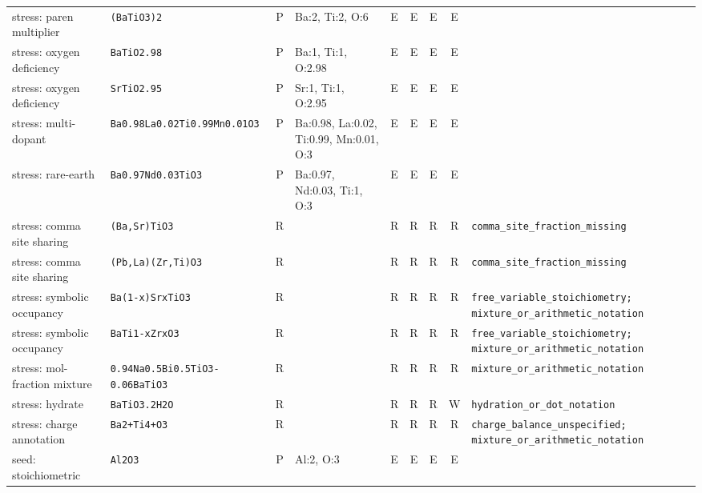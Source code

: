 \begin{longtable}{@{}>{\raggedright\arraybackslash}p{2.5cm}lcp{2.9cm}cccc>{\raggedright\arraybackslash}p{2.7cm}@{}}
stress: paren multiplier & \texttt{(BaTiO3)2} & P & Ba:2, Ti:2, O:6 & E & E & E & E & {\scriptsize\texttt{}} \\
stress: oxygen deficiency & \texttt{BaTiO2.98} & P & Ba:1, Ti:1, O:2.98 & E & E & E & E & {\scriptsize\texttt{}} \\
stress: oxygen deficiency & \texttt{SrTiO2.95} & P & Sr:1, Ti:1, O:2.95 & E & E & E & E & {\scriptsize\texttt{}} \\
stress: multi-dopant & \texttt{Ba0.98La0.02Ti0.99Mn0.01O3} & P & Ba:0.98, La:0.02, Ti:0.99, Mn:0.01, O:3 & E & E & E & E & {\scriptsize\texttt{}} \\
stress: rare-earth & \texttt{Ba0.97Nd0.03TiO3} & P & Ba:0.97, Nd:0.03, Ti:1, O:3 & E & E & E & E & {\scriptsize\texttt{}} \\
stress: comma site sharing & \texttt{(Ba,Sr)TiO3} & R &  & R & R & R & R & {\scriptsize\texttt{comma\_\allowbreak{}site\_\allowbreak{}fraction\_\allowbreak{}missing}} \\
stress: comma site sharing & \texttt{(Pb,La)(Zr,Ti)O3} & R &  & R & R & R & R & {\scriptsize\texttt{comma\_\allowbreak{}site\_\allowbreak{}fraction\_\allowbreak{}missing}} \\
stress: symbolic occupancy & \texttt{Ba(1-x)SrxTiO3} & R &  & R & R & R & R & {\scriptsize\texttt{free\_\allowbreak{}variable\_\allowbreak{}stoichiometry; mixture\_\allowbreak{}or\_\allowbreak{}arithmetic\_\allowbreak{}notation}} \\
stress: symbolic occupancy & \texttt{BaTi1-xZrxO3} & R &  & R & R & R & R & {\scriptsize\texttt{free\_\allowbreak{}variable\_\allowbreak{}stoichiometry; mixture\_\allowbreak{}or\_\allowbreak{}arithmetic\_\allowbreak{}notation}} \\
stress: mol-fraction mixture & \texttt{0.94Na0.5Bi0.5TiO3-0.06BaTiO3} & R &  & R & R & R & R & {\scriptsize\texttt{mixture\_\allowbreak{}or\_\allowbreak{}arithmetic\_\allowbreak{}notation}} \\
stress: hydrate & \texttt{BaTiO3.2H2O} & R &  & R & R & R & W & {\scriptsize\texttt{hydration\_\allowbreak{}or\_\allowbreak{}dot\_\allowbreak{}notation}} \\
stress: charge annotation & \texttt{Ba2+Ti4+O3} & R &  & R & R & R & R & {\scriptsize\texttt{charge\_\allowbreak{}balance\_\allowbreak{}unspecified; mixture\_\allowbreak{}or\_\allowbreak{}arithmetic\_\allowbreak{}notation}} \\
seed: stoichiometric & \texttt{Al2O3} & P & Al:2, O:3 & E & E & E & E & {\scriptsize\texttt{}} \\

\end{longtable}
